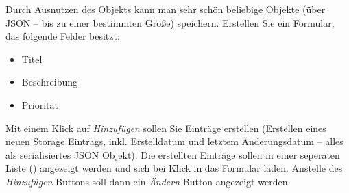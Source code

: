 %
\par Durch Ausnutzen des  Objekts kann man sehr schön beliebige Objekte (über JSON – bis zu einer bestimmten Größe) speichern. Erstellen Sie ein Formular, das folgende Felder besitzt:
%
\begin{itemize}
\item Titel
\item Beschreibung
\item Priorität
\end{itemize}
%
\par Mit einem Klick auf \emph{Hinzufügen} sollen Sie Einträge erstellen (Erstellen eines neuen Storage Eintrags, inkl. Erstelldatum und letztem Änderungsdatum – alles als serialisiertes JSON Objekt). Die erstellten Einträge sollen in einer seperaten Liste () angezeigt werden und sich bei Klick in das Formular laden. Anstelle des \emph{Hinzufügen} Buttons soll dann ein \emph{Ändern} Button angezeigt werden.